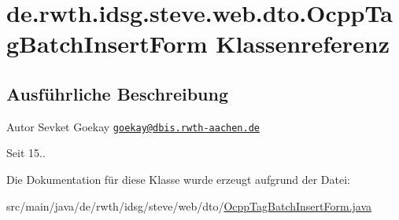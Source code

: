 \hypertarget{classde_1_1rwth_1_1idsg_1_1steve_1_1web_1_1dto_1_1_ocpp_tag_batch_insert_form}{\section{de.\+rwth.\+idsg.\+steve.\+web.\+dto.\+Ocpp\+Tag\+Batch\+Insert\+Form Klassenreferenz}
\label{classde_1_1rwth_1_1idsg_1_1steve_1_1web_1_1dto_1_1_ocpp_tag_batch_insert_form}
}


\subsection{Ausführliche Beschreibung}
\begin{DoxyAuthor}{Autor}
Sevket Goekay \href{mailto:goekay@dbis.rwth-aachen.de}{\tt goekay@dbis.\+rwth-\/aachen.\+de} 
\end{DoxyAuthor}
\begin{DoxySince}{Seit}
15.. 
\end{DoxySince}


Die Dokumentation für diese Klasse wurde erzeugt aufgrund der Datei\+:\begin{DoxyCompactItemize}
\item 
src/main/java/de/rwth/idsg/steve/web/dto/\hyperlink{_ocpp_tag_batch_insert_form_8java}{Ocpp\+Tag\+Batch\+Insert\+Form.\+java}\end{DoxyCompactItemize}
